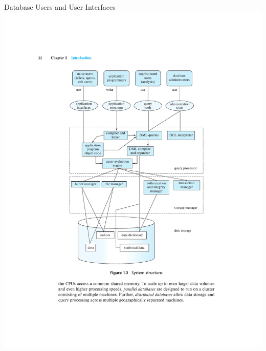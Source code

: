 \documentclass{beamer}
\begin{document}
\begin{frame}{Database Users and User Interfaces}
    \centering 
    \includegraphics[width=0.625\textheight, trim={5.25cm 6.75cm 4.9cm 4.8cm}, clip]{figures/arch2}
\end{frame}
\end{document}
